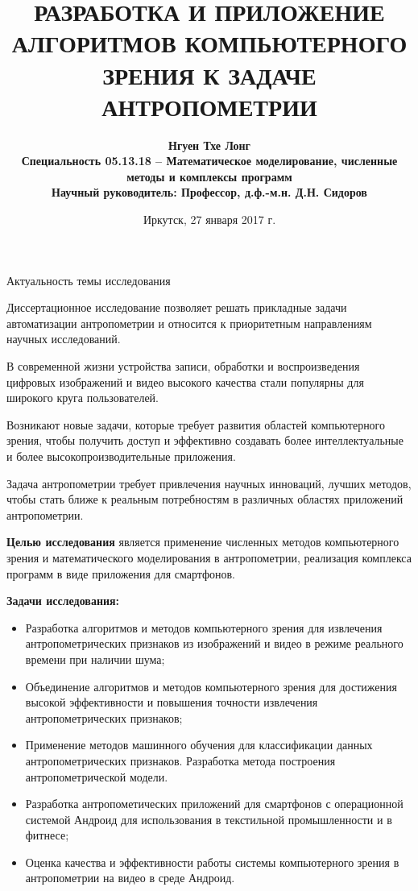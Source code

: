 \documentclass[10pt,pdf,hyperref={unicode},xcolor=table]{beamer}
\title[Алгоритмы КЗ в антропометрии]{РАЗРАБОТКА И ПРИЛОЖЕНИЕ АЛГОРИТМОВ КОМПЬЮТЕРНОГО ЗРЕНИЯ К ЗАДАЧЕ АНТРОПОМЕТРИИ}
\subtitle[кор. подназв.]{}
\author[Нгуен Тхе Лонг] %
{\bf{Нгуен Тхе Лонг}\\
Специальность 05.13.18  – Математическое моделирование, численные методы и комплексы программ\\
Научный руководитель: Профессор, д.ф.-м.н. Д.Н. Сидоров}
\date[]{ Иркутск, 27 января 2017 г.} %
\begin{document}
\maketitle
\begin{frame}{Актуальность темы исследования}
\begin{block}{}
Диссертационное исследование позволяет решать прикладные задачи автоматизации антропометрии и относится к приоритетным направлениям научных исследований.
\end{block}
\begin{block}{}
В современной жизни устройства записи, обработки и воспроизведения цифровых изображений и видео высокого качества стали популярны для широкого круга пользователей.
\end{block}
\begin{block}{}
Возникают новые задачи, которые требует развития областей компьютерного зрения, чтобы получить доступ и эффективно создавать более интеллектуальные и более высокопроизводительные приложения.
\end{block} 
\begin{block}{}
Задача антропометрии требует привлечения научных инноваций, лучших методов, чтобы стать ближе к реальным потребностям в различных областях приложений антропометрии.
\end{block} 
\end{frame}
\begin{frame}{}
\begin{block}{}
\textbf{Целью исследования} является применение численных методов компьютерного зрения и математического моделирования в антропометрии, реализация комплекса программ в виде приложения для смартфонов.
\end{block}
\begin{block}{}
\textbf{Задачи исследования:}
\begin{itemize}
	\item Разработка алгоритмов и методов компьютерного зрения для извлечения антропометрических признаков из изображений и видео в режиме реального времени при наличии шума;
	\item Объединение алгоритмов и методов компьютерного зрения для достижения высокой эффективности и повышения точности извлечения антропометрических признаков;
	\item Применение методов машинного обучения для классификации данных антропометрических признаков. Разработка метода построения антропометрической модели.
	\item Разработка антропометических приложений для смартфонов с операционной системой Андроид для использования в текстильной промышленности и в фитнесе;
	\item Оценка качества и эффективности работы системы компьютерного зрения в антропометрии на видео в среде Андроид.
\end{itemize}
\end{block}
\end{frame}
\end{document}
